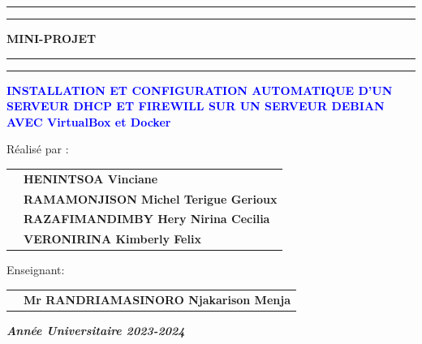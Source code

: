 \begin{titlepage}
\begin{center}
\end{center}
		\vspace{0.5cm}
	\begin{center}
		\hrule width 16cm height 2pt
		\vspace{0.1cm}
		\hrule width 16cm height 1pt
			\vspace{0.2cm}
		\Large \textbf{MINI-PROJET}
			\vspace{0.2cm}
			\hrule width 16cm height 1pt
				\vspace{0.1cm}
			\hrule width 16cm height 2pt
	\end{center}
			\vspace{0.5cm}
	\begin{center}
		\Large \textbf{\textcolor{blue}{INSTALLATION ET CONFIGURATION AUTOMATIQUE D'UN SERVEUR DHCP ET FIREWILL SUR UN SERVEUR DEBIAN AVEC VirtualBox et Docker}}
	\end{center}
		\vspace{0.5cm}
	\hspace{2cm}	\small Réalisé par :
	\begin{center}
	\begin{tabular}{ll}
	
	 &  \small\textbf{HENINTSOA Vinciane }\\
	  &  \small\textbf{RAMAMONJISON Michel Terigue Gerioux }\\
	   &  \small\textbf{RAZAFIMANDIMBY Hery Nirina Cecilia }\\
	    &  \small\textbf{VERONIRINA Kimberly Felix }\\
	
	\end{tabular}
	\end{center}
\vspace{0.5cm}
	\hspace{2cm} \small Enseignant:\\
\begin{center}
\vspace{-0.8cm}
	\begin{tabular}{ll}	
	&  \small\textbf{Mr RANDRIAMASINORO Njakarison Menja }\\
	\end{tabular}
\end{center}
	\vspace{1cm}
	\begin{center}
		\small \textbf{\textit{Année Universitaire 2023-2024}}
	\end{center}
\end{titlepage}
